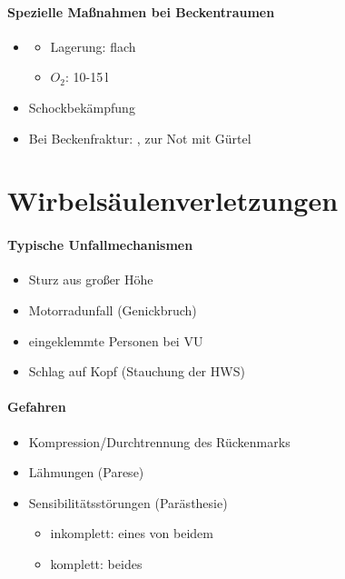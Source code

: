 \begin{gMassnahmenEnv}
    \paragraph{Spezielle Maßnahmen bei Beckentraumen}
    \begin{itemize}
        \item \gTxMassVitBes
        \begin{itemize}
            \item Lagerung: flach
            \item $O_2$: 10-15\,l
        \end{itemize}
        \item Schockbek\"ampfung
        \item Bei Beckenfraktur:
        , zur Not mit
        G\"urtel
    \end{itemize}
\end{gMassnahmenEnv}




\section{Wirbels\"aulenverletzungen}


\paragraph{Typische Unfallmechanismen}

\begin{itemize}
    \item Sturz aus gro{\ss}er H\"ohe
    \item Motorradunfall (Genickbruch)
    \item eingeklemmte Personen bei VU
    \item Schlag auf Kopf (Stauchung der HWS)
\end{itemize}

\paragraph{Gefahren}

\begin{itemize}
    \item Kompression/Durchtrennung des  R\"uckenmarks
    \item L\"ahmungen (Parese)
    \item Sensibilit\"atsst\"orungen (Par\"asthesie)
    \begin{itemize}
        \item inkomplett: eines von beidem
        \item komplett: beides
    \end{itemize}
\end{itemize}

